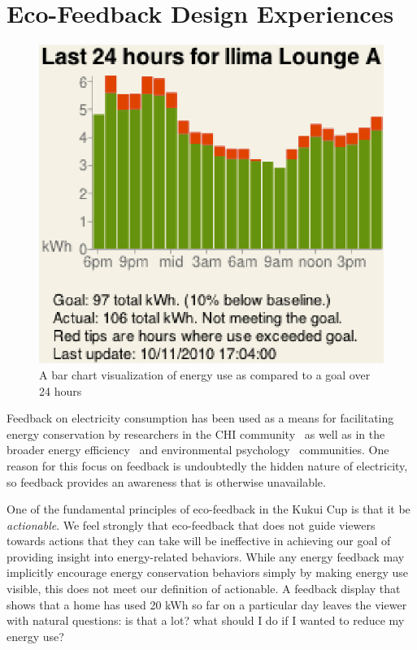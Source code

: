 \documentclass{sigchi}
\begin{document}
\section{Eco-Feedback Design Experiences}

\begin{figure}[!tb]
	\centering
	\includegraphics[width=0.7\columnwidth]{energy-24hours-new.eps}
	\caption{A bar chart visualization of energy use as compared to a goal over 24 hours}
	\label{fig:energy-24hours}
\end{figure}

Feedback on electricity consumption has been used as a means for facilitating energy conservation by researchers in the CHI community~\cite{Froehlich2010} as well as in the broader energy efficiency~\cite{darby-review-2006, Faruqui09, Foster-2012} and environmental psychology~\cite{Becker78, Houwelingen89} communities. One reason for this focus on feedback is undoubtedly the hidden nature of electricity, so feedback provides an awareness that is otherwise unavailable.

One of the fundamental principles of eco-feedback in the Kukui Cup is that it be \emph{actionable}. We feel strongly that eco-feedback that does not guide viewers towards actions that they can take will be ineffective in achieving our goal of providing insight into energy-related behaviors. While any energy feedback may implicitly encourage energy conservation behaviors simply by making energy use visible, this does not meet our definition of actionable. A feedback display that shows that a home has used 20 kWh so far on a particular day leaves the viewer with natural questions: is that a lot? what should I do if I wanted to reduce my energy use?
\end{document}

